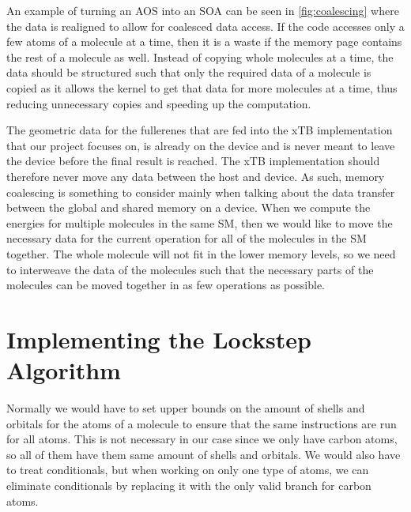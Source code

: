 
An example of turning an AOS into an SOA can be seen in \autoref{fig:coalescing} where the data is realigned to allow for coalesced data access. If the code accesses only a few atoms of a molecule at a time, then it is a waste if the memory page contains the rest of a molecule as well. Instead of copying whole molecules at a time, the data should be structured such that only the required data of a molecule is copied as it allows the kernel to get that data for more molecules at a time, thus reducing unnecessary copies and speeding up the computation.

The geometric data for the fullerenes that are fed into the xTB implementation that our project focuses on, is already on the device and is never meant to leave the device before the final result is reached. The xTB implementation should therefore never move any data between the host and device. As such, memory coalescing is something to consider mainly when talking about the data transfer between the global and shared memory on a device. When we compute the energies for multiple molecules in the same SM, then we would like to move the necessary data for the current operation for all of the molecules in the SM together. The whole molecule will not fit in the lower memory levels, so we need to interweave the data of the molecules such that the necessary parts of the molecules can be moved together in as few operations as possible.


\section{Implementing the Lockstep Algorithm}

Normally we would have to set upper bounds on the amount of shells and orbitals for the atoms of a molecule to ensure that the same instructions are run for all atoms. This is not necessary in our case since we only have carbon atoms, so all of them have them same amount of shells and orbitals. We would also have to treat conditionals, but when working on only one type of atoms, we can eliminate conditionals by replacing it with the only valid branch for carbon atoms.







